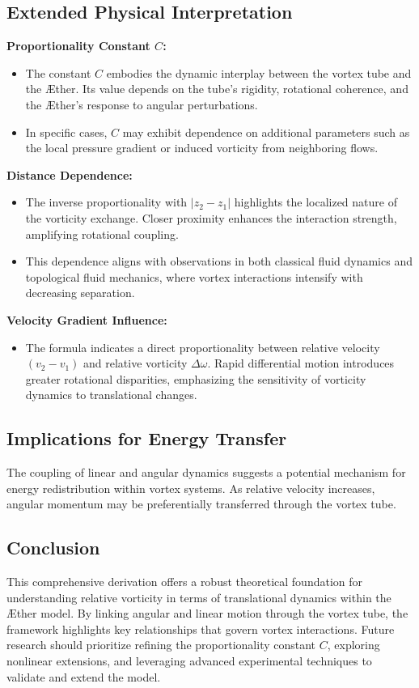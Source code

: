     \subsection*{Extended Physical Interpretation}
    \textbf{Proportionality Constant $C$:}
    \begin{itemize}
        \item The constant $C$ embodies the dynamic interplay between the vortex tube and the Æther. Its value depends on the tube’s rigidity, rotational coherence, and the Æther’s response to angular perturbations.
        \item In specific cases, $C$ may exhibit dependence on additional parameters such as the local pressure gradient or induced vorticity from neighboring flows.
    \end{itemize}

    \textbf{Distance Dependence:}
    \begin{itemize}
        \item The inverse proportionality with $|z_2 - z_1|$ highlights the localized nature of the vorticity exchange. Closer proximity enhances the interaction strength, amplifying rotational coupling.
        \item This dependence aligns with observations in both classical fluid dynamics and topological fluid mechanics, where vortex interactions intensify with decreasing separation.
    \end{itemize}

    \textbf{Velocity Gradient Influence:}
    \begin{itemize}
        \item The formula indicates a direct proportionality between relative velocity $(v_2 - v_1)$ and relative vorticity $\Delta \omega$. Rapid differential motion introduces greater rotational disparities, emphasizing the sensitivity of vorticity dynamics to translational changes.
    \end{itemize}

    \subsection*{Implications for Energy Transfer}
    The coupling of linear and angular dynamics suggests a potential mechanism for energy redistribution within vortex systems. As relative velocity increases, angular momentum may be preferentially transferred through the vortex tube.

    \subsection*{Conclusion}
    This comprehensive derivation offers a robust theoretical foundation for understanding relative vorticity in terms of translational dynamics within the Æther model. By linking angular and linear motion through the vortex tube, the framework highlights key relationships that govern vortex interactions. Future research should prioritize refining the proportionality constant $C$, exploring nonlinear extensions, and leveraging advanced experimental techniques to validate and extend the model.

